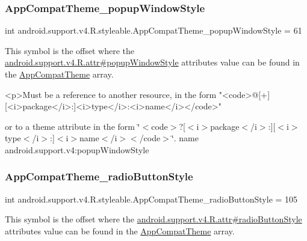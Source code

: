\subsubsection{\texorpdfstring{App\+Compat\+Theme\+\_\+popup\+Window\+Style}{AppCompatTheme\_popupWindowStyle}}
{\footnotesize\ttfamily int android.\+support.\+v4.\+R.\+styleable.\+App\+Compat\+Theme\+\_\+popup\+Window\+Style = 61\hspace{0.3cm}{\ttfamily [static]}}

This symbol is the offset where the \hyperlink{classandroid_1_1support_1_1v4_1_1R_1_1attr_a4927a489f5738a700c74abb08ce2efd0}{android.\+support.\+v4.\+R.\+attr\#popup\+Window\+Style} attribute\textquotesingle{}s value can be found in the \hyperlink{classandroid_1_1support_1_1v4_1_1R_1_1styleable_ac07ebbe62ed977f6dcaadc6397840ace}{App\+Compat\+Theme} array.

\begin{DoxyVerb}      <p>Must be a reference to another resource, in the form "<code>@[+][<i>package</i>:]<i>type</i>:<i>name</i></code>"
\end{DoxyVerb}
 or to a theme attribute in the form \char`\"{}$<$code$>$?\mbox{[}$<$i$>$package$<$/i$>$\+:\mbox{]}\mbox{[}$<$i$>$type$<$/i$>$\+:\mbox{]}$<$i$>$name$<$/i$>$$<$/code$>$\char`\"{}.  name android.\+support.\+v4\+:popup\+Window\+Style \mbox{\label{classandroid_1_1support_1_1v4_1_1R_1_1styleable_a72d4902394fb50357cc43cdbde732b4c}} 
\subsubsection{\texorpdfstring{App\+Compat\+Theme\+\_\+radio\+Button\+Style}{AppCompatTheme\_radioButtonStyle}}
{\footnotesize\ttfamily int android.\+support.\+v4.\+R.\+styleable.\+App\+Compat\+Theme\+\_\+radio\+Button\+Style = 105\hspace{0.3cm}{\ttfamily [static]}}

This symbol is the offset where the \hyperlink{classandroid_1_1support_1_1v4_1_1R_1_1attr_a3a741ae2c60e3e084c070a7d57e55f6b}{android.\+support.\+v4.\+R.\+attr\#radio\+Button\+Style} attribute\textquotesingle{}s value can be found in the \hyperlink{classandroid_1_1support_1_1v4_1_1R_1_1styleable_ac07ebbe62ed977f6dcaadc6397840ace}{App\+Compat\+Theme} array.

